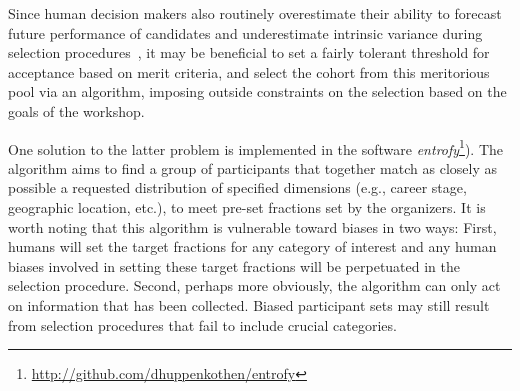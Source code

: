\documentclass{aastex62}
\begin{document}
Since human decision makers also routinely overestimate their ability to forecast future performance of candidates and underestimate intrinsic variance during selection procedures~\citep{highhouse2008}, it may be beneficial to set a fairly tolerant threshold for acceptance based on merit criteria, and select the cohort from this meritorious pool via an algorithm, imposing outside constraints on the selection based on the goals of the workshop.

One solution to the latter problem is implemented in the software \textit{entrofy}\footnote{\url{http://github.com/dhuppenkothen/entrofy}}).
The algorithm aims to find a group of participants that together match as closely as possible a requested distribution of specified dimensions (e.g., career stage, geographic location, etc.), to meet pre-set fractions set by the organizers.
It is worth noting that this algorithm is vulnerable toward biases in two ways: First, humans will set the target fractions for any category of interest and any human biases involved in setting these target fractions will be perpetuated in the selection procedure.
Second, perhaps more obviously, the algorithm can only act on information that has been collected.
Biased participant sets may still result from selection procedures that fail to include crucial categories.
\end{document}
